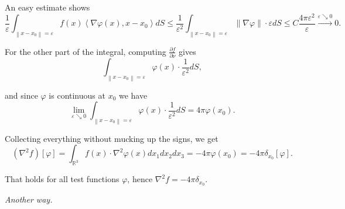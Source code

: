 \documentclass[12pt]{article}
\begin{document}
An easy estimate shows
\[
\frac{1}{\varepsilon} \int_{\left\|x-x_0\right\|=\varepsilon} f(x)\left\langle\nabla \varphi(x), x-x_0\right\rangle d S \leqslant \frac{1}{\varepsilon^2} \int_{\left\|x-x_0\right\|=\varepsilon}\|\nabla \varphi\| \cdot \varepsilon d S \leqslant C \frac{4 \pi \varepsilon^2}{\varepsilon} \xrightarrow{\varepsilon \searrow 0} 0 .
\]

For the other part of the integral, computing \(\frac{\partial f}{\partial \nu}\) gives
\[
\int_{\left\|x-x_0\right\|=\varepsilon} \varphi(x) \cdot \frac{1}{\varepsilon^2} d S,
\]

and since \(\varphi\) is continuous at \(x_0\) we have
\[
\lim _{\varepsilon \searrow 0} \int_{\left\|x-x_0\right\|=\varepsilon} \varphi(x) \cdot \frac{1}{\varepsilon^2} d S=4 \pi \varphi\left(x_0\right) .
\]

Collecting everything without mucking up the signs, we get
\[
\left(\nabla^2 f\right)[\varphi]=\int_{\mathbb{R}^3} f(x) \cdot \nabla^2 \varphi(x) d x_1 d x_2 d x_3=-4 \pi \varphi\left(x_0\right)=-4 \pi \delta_{x_0}[\varphi] .
\]

That holds for all test functions \(\varphi\), hence \(\nabla^2 f=-4 \pi \delta_{x_0}\).


\textit{Another way.}
\end{document}

